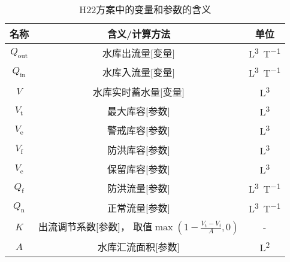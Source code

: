 \begin{table}[htbp]
  \centering
  \caption{H22方案中的变量和参数的含义}
  \label{tab:H22方案变量参数表}
  \begin{tabular}{ccc}
    \toprule
    名称                                                                & 含义/计算方法                   & 单位              \\ \midrule
    $Q_{\mathrm{out}}$                                                  & 水库出流量[变量]                & \unit{L^3.T^{-1}} \\
    $Q_{\mathrm{in}}$                                                   & 水库入流量[变量]                & \unit{L^3.T^{-1}} \\
    $V$                                                                 & 水库实时蓄水量[变量]            & \unit{L^3}        \\
    $V_{\mathrm{t}}$                                                    & 最大库容[参数]                  & \unit{L^3}        \\
    $V_{\mathrm{e}}$                                                    & 警戒库容[参数]                  & \unit{L^3}        \\
    $V_{\mathrm{f}}$                                                    & 防洪库容[参数]                  & \unit{L^3}        \\
    $V_{\mathrm{c}}$                                                    & 保留库容[参数]                  & \unit{L^3}        \\
    $Q_{\mathrm{f}}$                                                    & 防洪流量[参数]                  & \unit{L^3.T^{-1}} \\
    $Q_{\mathrm{n}}$                                                    & 正常流量[参数]                  & \unit{L^3.T^{-1}} \\
    $K$                                                                 & \makecell{出流调节系数[参数]， \\
    取值$\max\left(1-\frac{V_{\mathrm{t}}-V_{\mathrm{f}}}{A},0\right)$} & -                              \\
    $A$                                                                 & 水库汇流面积[参数]              & \unit{L^2}        \\
    \bottomrule
  \end{tabular}
\end{table}

